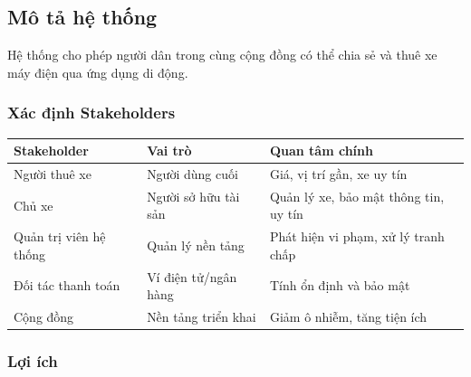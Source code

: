 \subsection{Mô tả hệ thống}
Hệ thống cho phép người dân trong cùng cộng đồng có thể chia sẻ và thuê xe máy điện qua ứng dụng di động.

\subsubsection*{Xác định Stakeholders}

\begin{longtable}{|>{\raggedright\arraybackslash}p{3cm}|
>{\raggedright\arraybackslash}p{5cm}|
>{\raggedright\arraybackslash}p{7cm}|}
\hline
\textbf{Stakeholder} & \textbf{Vai trò} & \textbf{Quan tâm chính} \\
\hline
Người thuê xe & Người dùng cuối & Giá, vị trí gần, xe uy tín \\
\hline
Chủ xe & Người sở hữu tài sản & Quản lý xe, bảo mật thông tin, uy tín \\
\hline
Quản trị viên hệ thống & Quản lý nền tảng & Phát hiện vi phạm, xử lý tranh chấp \\
\hline
Đối tác thanh toán & Ví điện tử/ngân hàng & Tính ổn định và bảo mật \\
\hline
Cộng đồng & Nền tảng triển khai & Giảm ô nhiễm, tăng tiện ích \\
\hline
\end{longtable}


\subsubsection*{Lợi ích}

